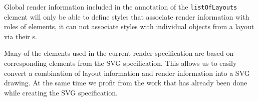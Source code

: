 Global render information included in the annotation of 
the \texttt{listOf\-Layouts} element will only be able to define styles that 
associate render information with roles of elements, it can not associate 
styles with individual objects from a layout via their s.

Many of the elements used in the current render specification are based on 
corresponding elements from the SVG specification. This allows us to easily convert a combination 
of layout information and render information into a SVG drawing. At the same time we profit 
from the work that has already been done while creating the SVG specification.
